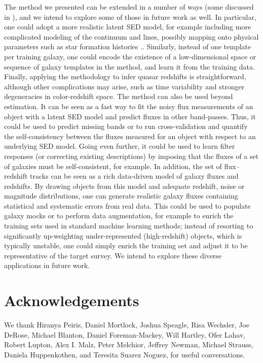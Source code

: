 \documentclass[aps,prd,showpacs,superscriptaddress,groupedaddress]{revtex4}  %
\begin{document}
The method we presented can be extended in a number of ways (some discussed in ), and we intend to explore some of those in future work as well.
In particular, one could adopt a more realistic latent SED model, for example including more complicated modeling of the continuum and lines, possibly mapping onto physical parameters such as star formation histories \cite[see \eg][]{Miller:2015:gpqso}..
Similarly, instead of one template per training galaxy, one could encode the existence of a low-dimensional space or sequence of galaxy templates in the method, and learn it from the training data.
Finally, applying the methodology to infer quasar redshifts is straightforward, although other complications may arise, such as time variability and stronger degeneracies in color-redshift space. 
The method can also be used beyond \photoz estimation. 
It can be seen as a fast way to fit the noisy flux measurements of an object with a latent SED model and predict fluxes in other band-passes.
Thus, it could be used to predict missing bands or to run cross-validation and quantify the self-consistency between the fluxes measured for an object with respect to an underlying SED model.
Going even further, it could be used to learn filter responses (or correcting existing descriptions) by imposing that the fluxes of a set of galaxies must be self-consistent, for example.
In addition, the set of flux--redshift tracks can be seen as a rich data-driven model of galaxy fluxes and redshifts. 
By drawing objects from this model and adequate redshift, noise or magnitude distributions, one can generate realistic galaxy fluxes containing statistical and systematic errors from real data.
This could be used to populate galaxy mocks or to perform data augmentation, for example to enrich the training sets used in standard machine learning methods; instead of resorting to significantly up-weighting under-represented (\eg high-redshift) objects, which is typically unstable, one could simply enrich the training set and adjust it to be representative of the target survey. 
We intend to explore these diverse applications in future work.



\section{Acknowledgements}

We thank Hiranya Peiris, Daniel Mortlock, Joshua Speagle, Risa Wechsler, Joe DeRose,
Michael Blanton, Daniel Foreman-Mackey, Will Hartley, Ofer Lahav, Robert Lupton, Alex I. Malz, Peter Melchior, Jeffrey Newman, Michael Strauss, Daniela Huppenkothen, and Teresita Suarez Noguez, for useful conversations.
\end{document}
